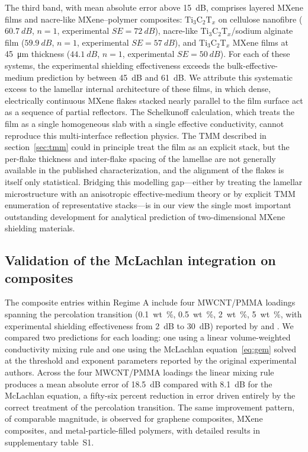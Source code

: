 \documentclass[review,3p,authoryear]{elsarticle}
\begin{document}
The third band, with mean absolute error above \SI{15}{dB}, comprises layered MXene films and nacre-like MXene--polymer composites: $\mathrm{Ti}_3\mathrm{C}_2\mathrm{T}_x$ on cellulose nanofibre ($\SI{60.7}{dB}$, $n = 1$, experimental $SE = \SI{72}{dB}$), nacre-like $\mathrm{Ti}_3\mathrm{C}_2\mathrm{T}_x$/sodium alginate film ($\SI{59.9}{dB}$, $n = 1$, experimental $SE = \SI{57}{dB}$), and Ti$_3$C$_2$T$_x$ MXene films at \SI{45}{\micro\metre} thickness ($\SI{44.1}{dB}$, $n = 1$, experimental $SE = \SI{50}{dB}$). For each of these systems, the experimental shielding effectiveness exceeds the bulk-effective-medium prediction by between \SI{45}{dB} and \SI{61}{dB}. We attribute this systematic excess to the lamellar internal architecture of these films, in which dense, electrically continuous MXene flakes stacked nearly parallel to the film surface act as a sequence of partial reflectors. The Schelkunoff calculation, which treats the film as a single homogeneous slab with a single effective conductivity, cannot reproduce this multi-interface reflection physics. The TMM described in section~\ref{sec:tmm} could in principle treat the film as an explicit stack, but the per-flake thickness and inter-flake spacing of the lamellae are not generally available in the published characterization, and the alignment of the flakes is itself only statistical. Bridging this modelling gap---either by treating the lamellar microstructure with an anisotropic effective-medium theory or by explicit TMM enumeration of representative stacks---is in our view the single most important outstanding development for analytical prediction of two-dimensional MXene shielding materials.

\subsection{Validation of the McLachlan integration on composites}

The composite entries within Regime A include four MWCNT/PMMA loadings spanning the percolation transition (\SI{0.1}{wt\%}, \SI{0.5}{wt\%}, \SI{2}{wt\%}, \SI{5}{wt\%}, with experimental shielding effectiveness from \SI{2}{dB} to \SI{30}{dB}) reported by \citet{AlSaleh2009} and \citet{Arjmand2011}. We compared two predictions for each loading: one using a linear volume-weighted conductivity mixing rule and one using the McLachlan equation~\eqref{eq:gem} solved at the threshold and exponent parameters reported by the original experimental authors. Across the four MWCNT/PMMA loadings the linear mixing rule produces a mean absolute error of \SI{18.5}{dB} compared with \SI{8.1}{dB} for the McLachlan equation, a fifty-six percent reduction in error driven entirely by the correct treatment of the percolation transition. The same improvement pattern, of comparable magnitude, is observed for graphene composites, MXene composites, and metal-particle-filled polymers, with detailed results in supplementary table~S1.
\end{document}
